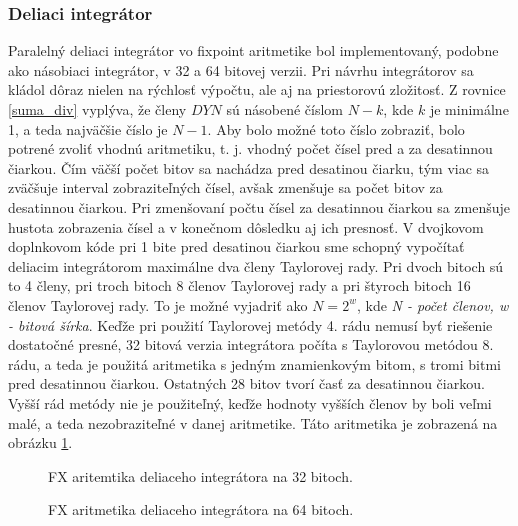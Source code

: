 \subsubsection*{Deliaci integrátor}

Paralelný deliaci integrátor vo fixpoint aritmetike bol implementovaný, podobne ako násobiaci integrátor, v 32 a 64 bitovej verzii. Pri návrhu integrátorov sa kládol dôraz nielen na rýchlosť výpočtu, ale aj na priestorovú zložitosť. 
Z rovnice \ref{suma_div} vyplýva, že členy $ DYN $ sú násobené číslom $ N-k $, kde $ k $ je minimálne 1, a teda najväčšie číslo je $ N-1 $. Aby bolo možné toto číslo zobraziť, bolo potrené zvoliť vhodnú aritmetiku, t. j. vhodný počet čísel pred a za desatinnou čiarkou. Čím väčší počet bitov sa nachádza pred desatinou čiarku, tým viac sa zväčšuje interval zobraziteľných čísel, avšak zmenšuje sa počet bitov za desatinnou čiarkou. Pri zmenšovaní počtu čísel za desatinnou čiarkou sa zmenšuje hustota zobrazenia čísel a v konečnom dôsledku aj ich presnosť. V dvojkovom doplnkovom kóde pri 1 bite pred desatinou čiarkou sme schopný vypočítať deliacim integrátorom maximálne dva členy Taylorovej rady. Pri dvoch bitoch sú to 4 členy, pri troch bitoch 8 členov Taylorovej rady a pri štyroch bitoch 16 členov Taylorovej rady. To je možné vyjadriť ako $ N = 2^{w} $, kde \textit{N - počet členov, w - bitová šírka}. Keďže pri použití Taylorovej metódy 4. rádu nemusí byť riešenie dostatočné presné, 32 bitová verzia integrátora počíta s Taylorovou metódou 8. rádu, a teda je použitá aritmetika s jedným znamienkovým bitom, s tromi bitmi pred desatinnou čiarkou. Ostatných 28 bitov tvorí časť za desatinnou čiarkou. Vyšší rád metódy nie je použiteľný, keďže hodnoty vyšších členov by boli veľmi malé, a teda nezobraziteľné v danej aritmetike. Táto aritmetika je zobrazená na obrázku \ref{fxdivaritmetic32}.

\bigskip
\begin{figure}[h]
\centering
{}
\caption{FX aritemtika deliaceho integrátora na 32 bitoch.}
\label{fxdivaritmetic32}
\end{figure}
\bigskip


\bigskip
\begin{figure}[h]
\centering
{}
\caption{FX aritmetika deliaceho integrátora na 64 bitoch.}
\label{fxdivaritmetic64}
\end{figure}
\bigskip

